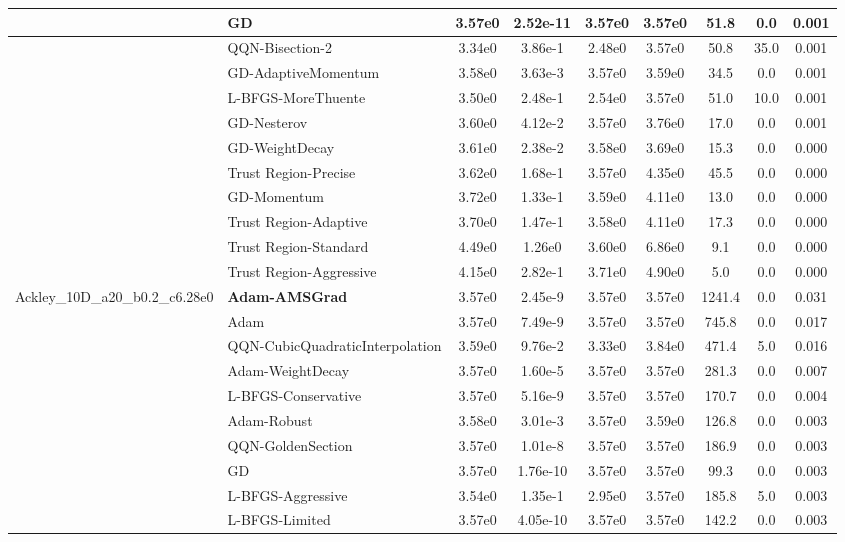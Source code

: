 \documentclass[10pt]{article}
\begin{document}
\begin{longtable}{|l|l|c|c|c|c|c|c|c|}
\hline
 & GD & 3.57e0 & 2.52e-11 & 3.57e0 & 3.57e0 & 51.8 & 0.0 & 0.001 \\
\hline
 & QQN-Bisection-2 & 3.34e0 & 3.86e-1 & 2.48e0 & 3.57e0 & 50.8 & 35.0 & 0.001 \\
\hline
 & GD-AdaptiveMomentum & 3.58e0 & 3.63e-3 & 3.57e0 & 3.59e0 & 34.5 & 0.0 & 0.001 \\
\hline
 & L-BFGS-MoreThuente & 3.50e0 & 2.48e-1 & 2.54e0 & 3.57e0 & 51.0 & 10.0 & 0.001 \\
\hline
 & GD-Nesterov & 3.60e0 & 4.12e-2 & 3.57e0 & 3.76e0 & 17.0 & 0.0 & 0.001 \\
\hline
 & GD-WeightDecay & 3.61e0 & 2.38e-2 & 3.58e0 & 3.69e0 & 15.3 & 0.0 & 0.000 \\
\hline
 & Trust Region-Precise & 3.62e0 & 1.68e-1 & 3.57e0 & 4.35e0 & 45.5 & 0.0 & 0.000 \\
\hline
 & GD-Momentum & 3.72e0 & 1.33e-1 & 3.59e0 & 4.11e0 & 13.0 & 0.0 & 0.000 \\
\hline
 & Trust Region-Adaptive & 3.70e0 & 1.47e-1 & 3.58e0 & 4.11e0 & 17.3 & 0.0 & 0.000 \\
\hline
 & Trust Region-Standard & 4.49e0 & 1.26e0 & 3.60e0 & 6.86e0 & 9.1 & 0.0 & 0.000 \\
\hline
 & Trust Region-Aggressive & 4.15e0 & 2.82e-1 & 3.71e0 & 4.90e0 & 5.0 & 0.0 & 0.000 \\
Ackley\_10D\_a20\_b0.2\_c6.28e0 & \textbf{Adam-AMSGrad} & 3.57e0 & 2.45e-9 & 3.57e0 & 3.57e0 & 1241.4 & 0.0 & 0.031 \\
\hline
 & Adam & 3.57e0 & 7.49e-9 & 3.57e0 & 3.57e0 & 745.8 & 0.0 & 0.017 \\
\hline
 & QQN-CubicQuadraticInterpolation & 3.59e0 & 9.76e-2 & 3.33e0 & 3.84e0 & 471.4 & 5.0 & 0.016 \\
\hline
 & Adam-WeightDecay & 3.57e0 & 1.60e-5 & 3.57e0 & 3.57e0 & 281.3 & 0.0 & 0.007 \\
\hline
 & L-BFGS-Conservative & 3.57e0 & 5.16e-9 & 3.57e0 & 3.57e0 & 170.7 & 0.0 & 0.004 \\
\hline
 & Adam-Robust & 3.58e0 & 3.01e-3 & 3.57e0 & 3.59e0 & 126.8 & 0.0 & 0.003 \\
\hline
 & QQN-GoldenSection & 3.57e0 & 1.01e-8 & 3.57e0 & 3.57e0 & 186.9 & 0.0 & 0.003 \\
\hline
 & GD & 3.57e0 & 1.76e-10 & 3.57e0 & 3.57e0 & 99.3 & 0.0 & 0.003 \\
\hline
 & L-BFGS-Aggressive & 3.54e0 & 1.35e-1 & 2.95e0 & 3.57e0 & 185.8 & 5.0 & 0.003 \\
\hline
 & L-BFGS-Limited & 3.57e0 & 4.05e-10 & 3.57e0 & 3.57e0 & 142.2 & 0.0 & 0.003 \\

\end{longtable}
\end{document}
